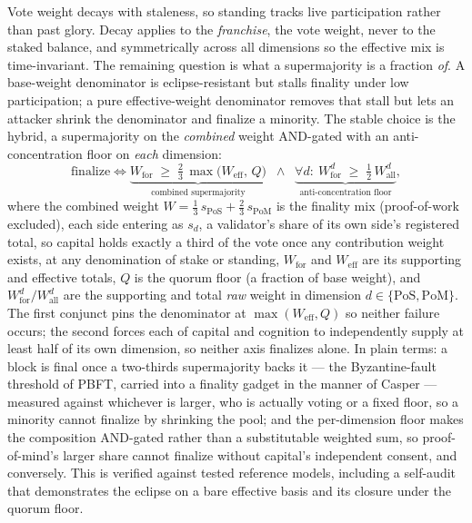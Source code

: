 \documentclass[10pt]{article}
\begin{document}
Vote weight decays with staleness, so standing tracks live participation rather than past glory. Decay
applies to the \emph{franchise}, the vote weight, never to the staked balance, and symmetrically across
all dimensions so the effective mix is time-invariant. The remaining question is what a supermajority
is a fraction \emph{of}. A base-weight denominator is eclipse-resistant but stalls finality under low
participation; a pure effective-weight denominator removes that stall but lets an attacker shrink the
denominator and finalize a minority. The stable choice is the hybrid, a supermajority on the
\emph{combined} weight AND-gated with an anti-concentration floor on \emph{each} dimension:
\begin{equation}
\text{finalize} \iff
\underbrace{W_{\text{for}} \;\ge\; \tfrac{2}{3}\,\max\!\big(W_{\text{eff}},\, Q\big)}_{\text{combined supermajority}}
\;\;\wedge\;\;
\underbrace{\forall d:\ W^{d}_{\text{for}} \;\ge\; \tfrac{1}{2}\,W^{d}_{\text{all}}}_{\text{anti-concentration floor}},
\end{equation}
where the combined weight $W = \tfrac13\,s_{\mathrm{PoS}} + \tfrac23\,s_{\mathrm{PoM}}$ is the finality
mix (proof-of-work excluded), each side entering as $s_d$, a validator's share of its own side's registered
total, so capital holds exactly a third of the vote once any contribution weight exists, at any
denomination of stake or standing, $W_{\text{for}}$ and $W_{\text{eff}}$ are its supporting and effective totals,
$Q$ is the quorum floor (a fraction of base weight), and $W^{d}_{\text{for}}/W^{d}_{\text{all}}$ are the
supporting and total \emph{raw} weight in dimension $d\in\{\mathrm{PoS},\mathrm{PoM}\}$. The first
conjunct pins the denominator at $\max(W_{\text{eff}},Q)$ so neither failure occurs; the second forces
each of capital and cognition to independently supply at least half of its own dimension, so neither axis
finalizes alone. In plain terms: a block is final once a two-thirds supermajority backs it --- the
Byzantine-fault threshold of PBFT, carried into a finality gadget in the manner of Casper --- measured
against whichever is larger, who is actually voting or a fixed floor, so a minority cannot finalize by
shrinking the pool; and the per-dimension floor makes the
composition AND-gated rather than a substitutable weighted sum, so proof-of-mind's larger share cannot
finalize without capital's independent consent, and conversely. This is verified against tested reference
models, including a self-audit that demonstrates the eclipse on a bare effective basis and its closure
under the quorum floor.
\end{document}
